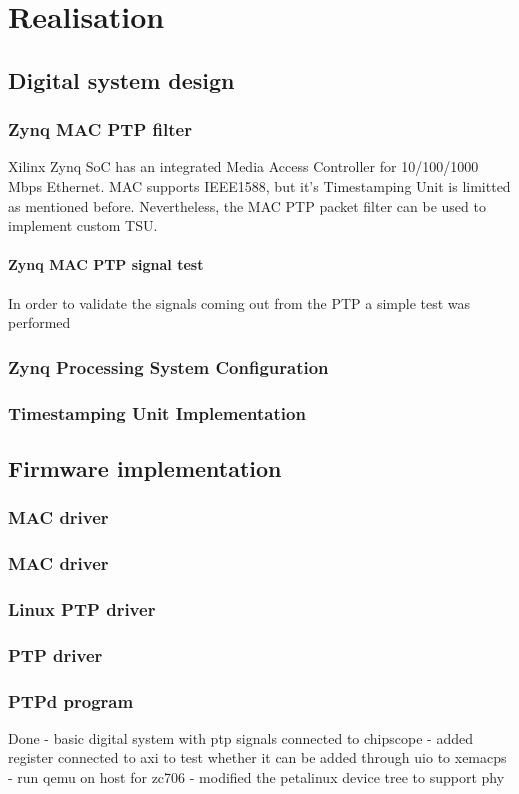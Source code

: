 \chapter{Realisation}

\section{Digital system design}
\subsection{Zynq MAC PTP filter}
Xilinx Zynq SoC has an integrated Media Access Controller for 10/100/1000 Mbps Ethernet. MAC supports
IEEE1588\cite[16.2.7]{XIL:UG585}, but it's Timestamping Unit is limitted as mentioned before. Nevertheless,
the MAC PTP packet filter can be used to implement custom TSU. 
\subsubsection{Zynq MAC PTP signal test}
In order to validate the signals coming out from the PTP a simple test was performed
\subsection{Zynq Processing System Configuration}
\subsection{Timestamping Unit Implementation}

\section{Firmware implementation}
\subsection{MAC driver}
\subsection{MAC driver}
\subsection{Linux PTP driver}
\subsection{PTP driver}
\subsection{PTPd program}



Done
- basic digital system with ptp signals connected to chipscope
- added register connected to axi to test whether it can be added through uio to xemacps
- run qemu on host for zc706
- modified the petalinux device tree to support phy
